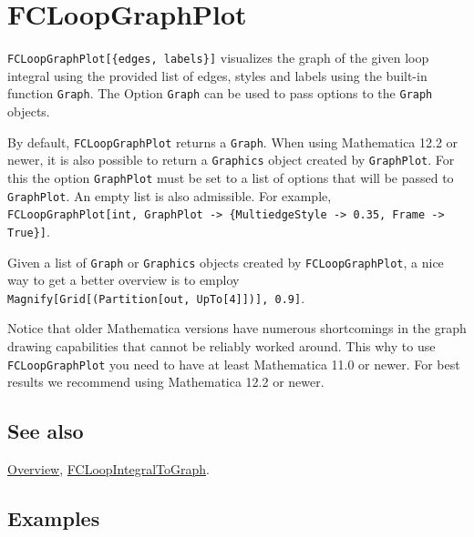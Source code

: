 \documentclass[../FeynCalcManual.tex]{subfiles}
\begin{document}
\begin{Shaded}
\begin{Highlighting}[]
 
\end{Highlighting}
\end{Shaded}

\hypertarget{fcloopgraphplot}{
\section{FCLoopGraphPlot}\label{fcloopgraphplot}}

\texttt{FCLoopGraphPlot[\allowbreak{}\{\allowbreak{}edges,\ \allowbreak{}labels\}]}
visualizes the graph of the given loop integral using the provided list
of edges, styles and labels using the built-in function \texttt{Graph}.
The Option \texttt{Graph} can be used to pass options to the
\texttt{Graph} objects.

By default, \texttt{FCLoopGraphPlot} returns a \texttt{Graph}. When
using Mathematica 12.2 or newer, it is also possible to return a
\texttt{Graphics} object created by \texttt{GraphPlot}. For this the
option \texttt{GraphPlot} must be set to a list of options that will be
passed to \texttt{GraphPlot}. An empty list is also admissible. For
example,
\texttt{FCLoopGraphPlot[\allowbreak{}int,\ \allowbreak{}GraphPlot -> \{\allowbreak{}MultiedgeStyle -> 0.35,\ \allowbreak{}Frame -> True\}]}.

Given a list of \texttt{Graph} or \texttt{Graphics} objects created by
\texttt{FCLoopGraphPlot}, a nice way to get a better overview is to
employ
\texttt{Magnify[\allowbreak{}Grid[\allowbreak{}(Partition[\allowbreak{}out,\ \allowbreak{}UpTo[\allowbreak{}4]])],\ \allowbreak{}0.9]}.

Notice that older Mathematica versions have numerous shortcomings in the
graph drawing capabilities that cannot be reliably worked around. This
why to use \texttt{FCLoopGraphPlot} you need to have at least
Mathematica 11.0 or newer. For best results we recommend using
Mathematica 12.2 or newer.

\subsection{See also}

\hyperlink{toc}{Overview},
\hyperlink{fcloopintegraltograph}{FCLoopIntegralToGraph}.

\subsection{Examples}
\end{document}
